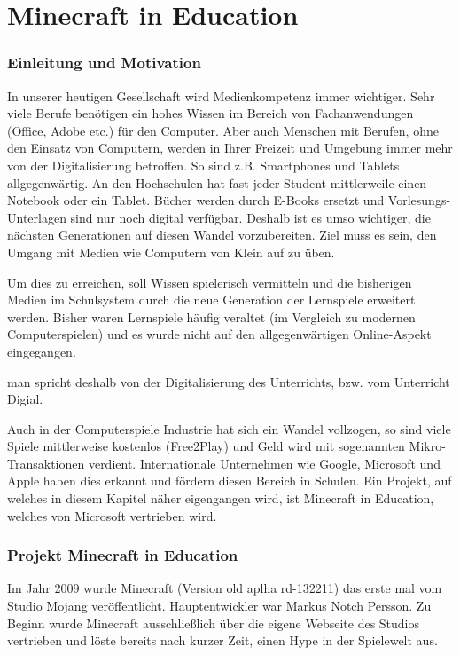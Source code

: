 \chapter{Minecraft in Education}
\subsection{Einleitung und Motivation}
In unserer heutigen Gesellschaft wird Medienkompetenz immer wichtiger. Sehr viele Berufe benötigen ein hohes Wissen im Bereich von Fachanwendungen (Office, Adobe etc.) für den Computer. 
Aber auch Menschen mit Berufen, ohne den Einsatz von Computern, werden in Ihrer Freizeit und Umgebung immer mehr von der Digitalisierung betroffen.
So sind z.B. Smartphones und Tablets allgegenwärtig. An den Hochschulen hat fast jeder Student mittlerweile einen Notebook oder ein Tablet.
Bücher werden durch E-Books ersetzt und Vorlesungs-Unterlagen sind nur noch digital verfügbar. Deshalb ist es umso wichtiger, die nächsten Generationen auf diesen Wandel vorzubereiten. 
Ziel muss es sein, den Umgang mit Medien wie Computern von Klein auf zu üben.

Um dies zu erreichen, soll Wissen spielerisch vermitteln und die bisherigen Medien im Schulsystem durch die neue Generation der Lernspiele erweitert werden.
Bisher waren Lernspiele häufig veraltet (im Vergleich zu modernen Computerspielen) und es wurde nicht auf den allgegenwärtigen Online-Aspekt eingegangen.

man spricht deshalb von der Digitalisierung des Unterrichts, bzw. vom Unterricht Digial.

Auch in der Computerspiele Industrie hat sich ein Wandel vollzogen, so sind viele Spiele mittlerweise kostenlos (Free2Play)
und Geld wird mit sogenannten Mikro-Transaktionen verdient. 
Internationale Unternehmen wie Google, Microsoft und Apple haben dies erkannt und fördern diesen Bereich in Schulen.
Ein Projekt, auf welches in diesem Kapitel näher eigengangen wird, ist Minecraft in Education, welches von Microsoft vertrieben wird.

\subsection{Projekt Minecraft in Education}

Im Jahr 2009 wurde Minecraft (Version old aplha rd-132211) das erste mal vom
Studio Mojang veröffentlicht. Hauptentwickler war Markus Notch Persson. Zu Beginn wurde Minecraft
ausschließlich über die eigene Webseite des Studios vertrieben und löste bereits nach kurzer Zeit,
einen Hype in der Spielewelt aus. 
\cite{WikiMinecraft}

